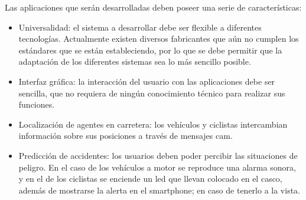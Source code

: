 Las aplicaciones que serán desarrolladas deben poseer una serie de
características:
\begin{itemize}
	\item Universalidad: el sistema a desarrollar debe ser flexible a diferentes
	tecnologías. Actualmente existen diversos fabricantes que aún no cumplen los
	estándares que se están estableciendo, por lo que se debe permitir que la
	adaptación de los diferentes sistemas sea lo más sencillo posible.

	\item Interfaz gráfica: la interacción del usuario con las aplicaciones debe
	ser sencilla, que no requiera de ningún conocimiento técnico para realizar sus
	funciones.

	\item Localización de agentes en carretera: los vehículos y ciclistas
	intercambian información sobre sus posiciones a través de mensajes \gls{cam}.

	\item Predicción de accidentes: los usuarios deben poder percibir las
	situaciones de peligro. En el caso de los vehículos a motor se reproduce una
	alarma sonora, y en el de los ciclistas se enciende un led que llevan colocado
	en el casco, además de mostrarse la alerta en el smartphone; en caso de
	tenerlo a la vista.
\end{itemize}
